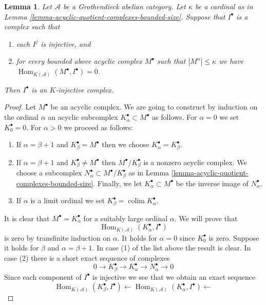 \documentclass{amsart}
\theoremstyle{plain}
\newtheorem{lemma}[subsection]{Lemma}
\theoremstyle{definition}
\theoremstyle{remark}
\numberwithin{equation}{subsection}
\def\colim{\mathop{\mathrm{colim}}\nolimits}
\def\Hom{\mathop{\mathrm{Hom}}\nolimits}
\begin{document}
\begin{lemma}
\label{lemma-characterize-K-injective}
Let $\mathcal{A}$ be a Grothendieck abelian category.
Let $\kappa$ be a cardinal as in
Lemma \ref{lemma-acyclic-quotient-complexes-bounded-size}.
Suppose that $I^\bullet$ is a complex such that
\begin{enumerate}
\item each $I^j$ is injective, and
\item for every bounded above acyclic complex $M^\bullet$
such that $|M^n| \leq \kappa$
we have $\Hom_{K(\mathcal{A})}(M^\bullet, I^\bullet) = 0$.
\end{enumerate}
Then $I^\bullet$ is an $K$-injective complex.
\end{lemma}

\begin{proof}
Let $M^\bullet$ be an acyclic complex. We are going to construct by
induction on the ordinal $\alpha$ an acyclic subcomplex
$K_\alpha^\bullet \subset M^\bullet$ as follows.
For $\alpha = 0$ we set $K_0^\bullet = 0$. For $\alpha > 0$
we proceed as follows:
\begin{enumerate}
\item If $\alpha = \beta + 1$ and $K_\beta^\bullet = M^\bullet$
then we choose $K_\alpha^\bullet = K_\beta^\bullet$.
\item If $\alpha = \beta + 1$ and $K_\beta^\bullet \not = M^\bullet$
then $M^\bullet/K_\beta^\bullet$ is a nonzero acyclic complex.
We choose a subcomplex $N_\alpha^\bullet \subset M^\bullet/K_\beta^\bullet$
as in Lemma \ref{lemma-acyclic-quotient-complexes-bounded-size}.
Finally, we let $K_\alpha^\bullet \subset M^\bullet$
be the inverse image of $N_\alpha^\bullet$.
\item If $\alpha$ is a limit ordinal we set
$K_\beta^\bullet = \colim K_\alpha^\bullet$.
\end{enumerate}
It is clear that $M^\bullet = K_\alpha^\bullet$ for a suitably large
ordinal $\alpha$. We will prove that
$$
\Hom_{K(\mathcal{A})}(K_\alpha^\bullet, I^\bullet)
$$
is zero by transfinite induction on $\alpha$. It holds for $\alpha = 0$
since $K_0^\bullet$ is zero. Suppose it holds for $\beta$ and
$\alpha = \beta + 1$. In case (1) of the list above the result is clear.
In case (2) there is a short exact sequence of complexes
$$
0 \to K_\beta^\bullet \to K_\alpha^\bullet \to N_\alpha^\bullet \to 0
$$
Since each component of $I^\bullet$ is injective we see that we obtain
an exact sequence
$$
\Hom_{K(\mathcal{A})}(K_\beta^\bullet, I^\bullet) \leftarrow
\Hom_{K(\mathcal{A})}(K_\alpha^\bullet, I^\bullet) \leftarrow
$$
\end{proof}
\end{document}
